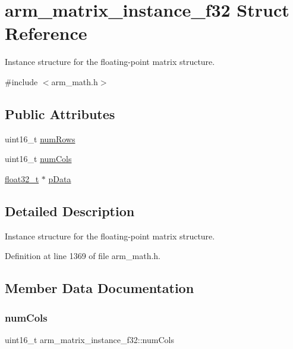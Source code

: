 \hypertarget{structarm__matrix__instance__f32}{}\section{arm\+\_\+matrix\+\_\+instance\+\_\+f32 Struct Reference}
\label{structarm__matrix__instance__f32}


Instance structure for the floating-\/point matrix structure.  




{\ttfamily \#include $<$arm\+\_\+math.\+h$>$}

\subsection*{Public Attributes}
\begin{DoxyCompactItemize}
\item 
uint16\+\_\+t \hyperlink{structarm__matrix__instance__f32_a23f4e34d70a82c9cad7612add5640b7b}{num\+Rows}
\item 
uint16\+\_\+t \hyperlink{structarm__matrix__instance__f32_acdd1fb73734df68b89565c54f1dd8ae2}{num\+Cols}
\item 
\hyperlink{arm__math_8h_a4611b605e45ab401f02cab15c5e38715}{float32\+\_\+t} $\ast$ \hyperlink{structarm__matrix__instance__f32_af3917c032600a9dfd5ed4a96f074910a}{p\+Data}
\end{DoxyCompactItemize}


\subsection{Detailed Description}
Instance structure for the floating-\/point matrix structure. 

Definition at line 1369 of file arm\+\_\+math.\+h.



\subsection{Member Data Documentation}
\mbox{\label{structarm__matrix__instance__f32_acdd1fb73734df68b89565c54f1dd8ae2}} 
\subsubsection{\texorpdfstring{num\+Cols}{numCols}}
{\footnotesize\ttfamily uint16\+\_\+t arm\+\_\+matrix\+\_\+instance\+\_\+f32\+::num\+Cols}

